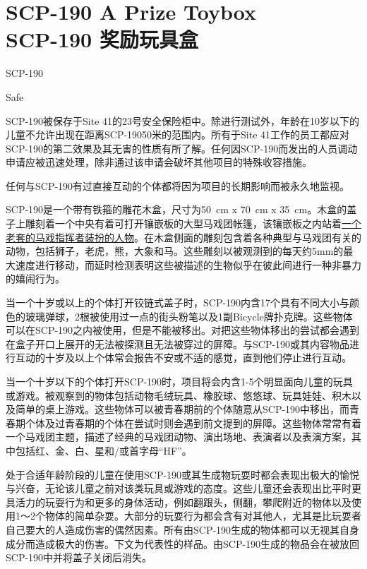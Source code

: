 \chapter[SCP-190 奖励玩具盒]{
    SCP-190 A Prize Toybox\\
    SCP-190 奖励玩具盒
}

\label{chap:SCP-190}

SCP-190

Safe

SCP-190被保存于Site 41的23号安全保险柜中。除进行测试外，年龄在10岁以下的儿童不允许出现在距离SCP-19050米的范围内。所有于Site 41工作的员工都应对SCP-190的第二效果及其无害的性质有所了解。任何因SCP-190而发出的人员调动申请应被迅速处理，除非通过该申请会破坏其他项目的特殊收容措施。

任何与SCP-190有过直接互动的个体都将因为项目的长期影响而被永久地监视。

SCP-190是一个带有铁箍的雕花木盒，尺寸为50 cm x 70 cm x 35 cm。木盒的盖子上雕刻着一个中央有着可打开镶嵌板的大型马戏团帐篷，该镶嵌板之内站着\hyperref[chap:COMP-herman-fuller-hub]{一个老套的马戏指挥者装扮的人物}。在木盒侧面的雕刻包含着各种典型与马戏团有关的动物，包括狮子，老虎，熊，大象和马。这些雕刻以被观测到的每天约5mm的最大速度进行移动，而延时检测表明这些被描述的生物似乎在彼此间进行一种非暴力的嬉闹行为。

当一个十岁或以上的个体打开铰链式盖子时，SCP-190内含17个具有不同大小与颜色的玻璃弹球，2根被使用过一点的街头粉笔以及1副Bicycle牌扑克牌。这些物体可以在SCP-190之内被使用，但是不能被移出。对把这些物体移出的尝试都会遇到在盒子开口上展开的无法被探测且无法被穿过的屏障。与SCP-190或其内容物品进行互动的十岁及以上个体常会报告不安或不适的感觉，直到他们停止进行互动。

当一个十岁以下的个体打开SCP-190时，项目将会内含1-5个明显面向儿童的玩具或游戏。被观察到的物体包括动物毛绒玩具、橡胶球、悠悠球、玩具娃娃、积木以及简单的桌上游戏。这些物体可以被青春期前的个体随意从SCP-190中移出，而青春期个体及过青春期的个体在尝试时则会遇到前文提到的屏障。这些物体常常有着一个马戏团主题，描述了经典的马戏团动物、演出场地、表演者以及表演方案，其中包括红、金、白、星和\slash 或首字母“HF”。

处于合适年龄阶段的儿童在使用SCP-190或其生成物玩耍时都会表现出极大的愉悦与兴奋，无论该儿童之前对该类玩具或游戏的态度。这些儿童还会表现出比平时更具活力的玩耍行为和更多的身体活动，例如翻跟头，侧翻，攀爬附近的物体以及使用1～2个物体的简单杂耍。大部分的玩耍行为都会含有对其他人，尤其是比玩耍者自己要大的人造成伤害的偶然因素。所有由SCP-190生成的物体都可以无视其自身成分而造成极大的伤害。下文为代表性的样品。由SCP-190生成的物品会在被放回SCP-190中并将盖子关闭后消失。

